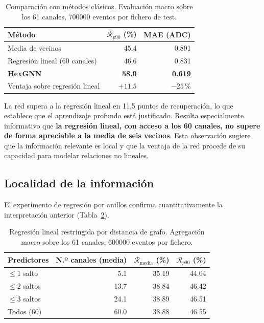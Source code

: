 \begin{table}[htbp]
\centering
\caption{Comparación con métodos clásicos. Evaluación macro sobre los 61 canales,
\num{700000} eventos por fichero de test.}
\label{tab:res-baselines}
\begin{tabular}{lrr}
\toprule
\textbf{Método} & $\mathcal{R}_{p90}$ (\%) & \textbf{MAE} (ADC) \\
\midrule
Media de vecinos & 45.4 & 0.891 \\
Regresión lineal (60 canales) & 46.6 & 0.831 \\
\textbf{HexGNN} & \textbf{58.0} & \textbf{0.619} \\
\midrule
Ventaja sobre regresión lineal & $+11.5$ & $-25\,\%$ \\
\bottomrule
\end{tabular}
\end{table}

La red supera a la regresión lineal en 11,5 puntos de recuperación, lo que establece que el
aprendizaje profundo está justificado. Resulta especialmente informativo que \textbf{la regresión
lineal, con acceso a los 60 canales, no supere de forma apreciable a la media de seis vecinos}. Esta
observación sugiere que la información relevante es local y que la ventaja de la red procede de su
capacidad para modelar relaciones no lineales.

\subsection{Localidad de la información}
\label{subsec:res-anillos}

El experimento de regresión por anillos confirma cuantitativamente la interpretación anterior
(Tabla~\ref{tab:res-anillos}).

\begin{table}[htbp]
\centering
\caption{Regresión lineal restringida por distancia de grafo. Agregación macro sobre los 61
canales, \num{600000} eventos por fichero.}
\label{tab:res-anillos}
\begin{tabular}{lrrr}
\toprule
\textbf{Predictores} & \textbf{N.º canales (media)} & $\mathcal{R}_{\text{media}}$ (\%) & $\mathcal{R}_{p90}$ (\%) \\
\midrule
$\leq 1$ salto & 5.1 & 35.19 & 44.04 \\
$\leq 2$ saltos & 13.7 & 38.84 & 46.42 \\
$\leq 3$ saltos & 24.1 & 38.89 & 46.51 \\
Todos (60) & 60.0 & 38.88 & 46.55 \\
\bottomrule
\end{tabular}
\end{table}

